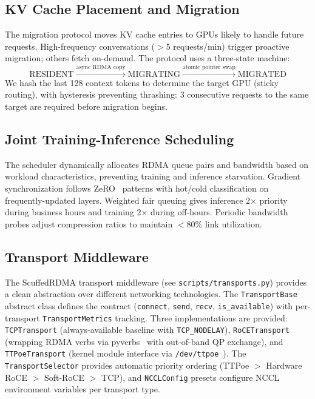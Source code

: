 \documentclass[11pt,letterpaper]{article}
\theoremstyle{definition}
\begin{document}
\subsection{KV Cache Placement and Migration}

The migration protocol moves KV cache entries to GPUs likely to handle future requests. High-frequency conversations ($>$5 requests/min) trigger proactive migration; others fetch on-demand. The protocol uses a three-state machine:
\begin{equation}
    \text{RESIDENT} \xrightarrow{\text{async RDMA copy}} \text{MIGRATING} \xrightarrow{\text{atomic pointer swap}} \text{MIGRATED}
\end{equation}
We hash the last 128 context tokens to determine the target GPU (sticky routing), with hysteresis preventing thrashing: 3 consecutive requests to the same target are required before migration begins.

\subsection{Joint Training-Inference Scheduling}

The scheduler dynamically allocates RDMA queue pairs and bandwidth based on workload characteristics, preventing training and inference starvation. Gradient synchronization follows ZeRO~\cite{zero2020} patterns with hot/cold classification on frequently-updated layers. Weighted fair queuing gives inference 2$\times$ priority during business hours and training 2$\times$ during off-hours. Periodic bandwidth probes adjust compression ratios to maintain $<$80\% link utilization.

\subsection{Transport Middleware}

The ScuffedRDMA transport middleware (see \texttt{scripts/transports.py}) provides a clean abstraction over different networking technologies. The \texttt{TransportBase} abstract class defines the contract (\texttt{connect}, \texttt{send}, \texttt{recv}, \texttt{is\_available}) with per-transport \texttt{TransportMetrics} tracking. Three implementations are provided: \texttt{TCPTransport} (always-available baseline with \texttt{TCP\_NODELAY}), \texttt{RoCETransport} (wrapping RDMA verbs via pyverbs~\cite{rdma-core} with out-of-band QP exchange), and \texttt{TTPoeTransport} (kernel module interface via \texttt{/dev/ttpoe}~\cite{ttpoe-repo}). The \texttt{TransportSelector} provides automatic priority ordering (TTPoe $>$ Hardware RoCE $>$ Soft-RoCE $>$ TCP), and \texttt{NCCLConfig} presets configure NCCL environment variables per transport type.
\end{document}
